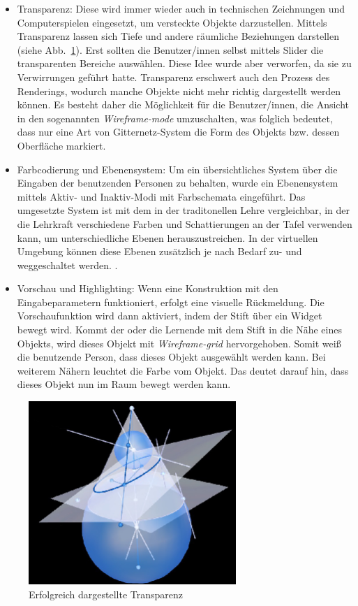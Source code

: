 \documentclass[deutsch]{llncs}
\begin{document}
\begin{itemize}
\item Transparenz: 
Diese wird  immer wieder auch in technischen Zeichnungen und Computerspielen eingesetzt, um versteckte Objekte darzustellen. Mittels Transparenz lassen sich Tiefe und andere räumliche Beziehungen darstellen (siehe Abb.~\ref{fig:transparency}). Erst sollten die Benutzer/innen selbst mittels Slider die transparenten Bereiche auswählen. Diese Idee wurde aber verworfen, da sie zu Verwirrungen geführt hatte. Transparenz erschwert auch den Prozess des Renderings, wodurch manche Objekte nicht mehr richtig dargestellt werden können\cite{1667626}. 
Es besteht daher die Möglichkeit für die Benutzer/innen, die Ansicht in den sogenannten \emph{Wireframe-mode} umzuschalten, was folglich bedeutet, dass nur eine Art von Gitternetz-System die Form des Objekts bzw. dessen Oberfläche markiert.  
\item Farbcodierung und Ebenensystem:
Um ein übersichtliches System über die Eingaben der benutzenden Personen zu behalten, wurde ein Ebenensystem mittels Aktiv- und Inaktiv-Modi mit Farbschemata eingeführt. Das umgesetzte System ist mit dem in der traditonellen Lehre vergleichbar, in der die Lehrkraft verschiedene Farben und Schattierungen an der Tafel verwenden kann, um unterschiedliche Ebenen herauszustreichen. In der virtuellen Umgebung können diese Ebenen zusätzlich je nach Bedarf zu- und weggeschaltet werden. \cite{1667626}. 
\item Vorschau und Highlighting:
Wenn eine Konstruktion mit den Eingabeparametern funktioniert, erfolgt eine visuelle Rückmeldung. Die Vorschaufunktion wird dann aktiviert, indem der Stift über ein Widget bewegt wird. Kommt der oder die Lernende mit dem Stift in die Nähe eines Objekts, wird dieses Objekt mit \emph{Wireframe-grid} hervorgehoben. Somit weiß die benutzende Person, dass dieses Objekt ausgewählt werden kann. Bei weiterem Nähern leuchtet die Farbe vom Objekt. Das deutet darauf hin, dass dieses Objekt nun im Raum bewegt werden kann\cite{1667626}.  
\end{itemize}
\begin{figure}[h]
	\centering
	\includegraphics[width=0.7\textwidth]{figures/transparency}
	\caption{Erfolgreich dargestellte Transparenz \cite{1667626}}
	\label{fig:transparency}
\end{figure} 
\end{document}
